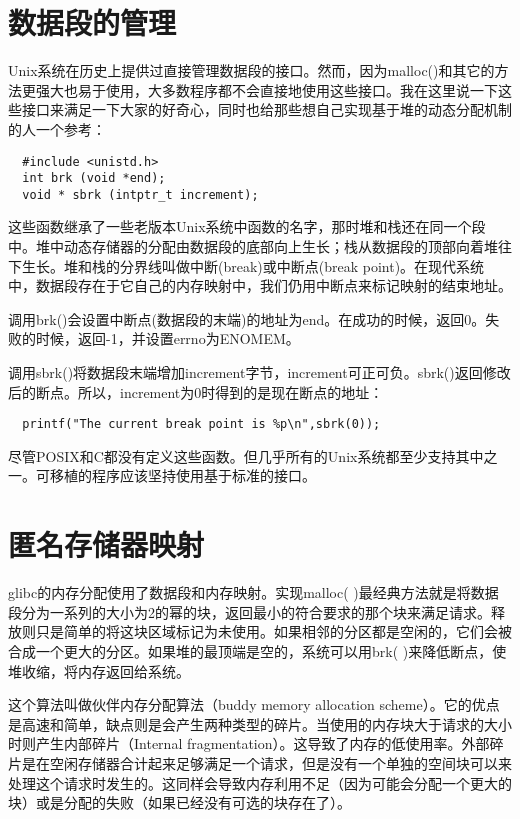 \section{数据段的管理}

Unix系统在历史上提供过直接管理数据段的接口。然而，因为malloc()和其它的方法更强大也易于使用，大多数程序都不会直接地使用这些接口。我在这里说一下这些接口来满足一下大家的好奇心，同时也给那些想自己实现基于堆的动态分配机制的人一个参考： 

\begin{lstlisting}
  #include <unistd.h>
  int brk (void *end);
  void * sbrk (intptr_t increment);
\end{lstlisting}

这些函数继承了一些老版本Unix系统中函数的名字，那时堆和栈还在同一个段中。堆中动态存储器的分配由数据段的底部向上生长；栈从数据段的顶部向着堆往下生长。堆和栈的分界线叫做中断(break)或中断点(break point)。在现代系统中，数据段存在于它自己的内存映射中，我们仍用中断点来标记映射的结束地址。

调用brk()会设置中断点(数据段的末端)的地址为end。在成功的时候，返回0。失败的时候，返回-1，并设置errno为ENOMEM。

调用sbrk()将数据段末端增加increment字节，increment可正可负。sbrk()返回修改后的断点。所以，increment为0时得到的是现在断点的地址： 

\begin{lstlisting}
  printf("The current break point is %p\n",sbrk(0));
\end{lstlisting}

尽管POSIX和C都没有定义这些函数。但几乎所有的Unix系统都至少支持其中之一。可移植的程序应该坚持使用基于标准的接口。 

\section{匿名存储器映射}

glibc的内存分配使用了数据段和内存映射。实现malloc( )最经典方法就是将数据段分为一系列的大小为2的幂的块，返回最小的符合要求的那个块来满足请求。释放则只是简单的将这块区域标记为未使用。如果相邻的分区都是空闲的，它们会被合成一个更大的分区。如果堆的最顶端是空的，系统可以用brk( )来降低断点，使堆收缩，将内存返回给系统。

这个算法叫做伙伴内存分配算法（buddy memory allocation scheme）。它的优点是高速和简单，缺点则是会产生两种类型的碎片。当使用的内存块大于请求的大小时则产生内部碎片（Internal fragmentation）。这导致了内存的低使用率。外部碎片是在空闲存储器合计起来足够满足一个请求，但是没有一个单独的空间块可以来处理这个请求时发生的。这同样会导致内存利用不足（因为可能会分配一个更大的块）或是分配的失败（如果已经没有可选的块存在了）。

